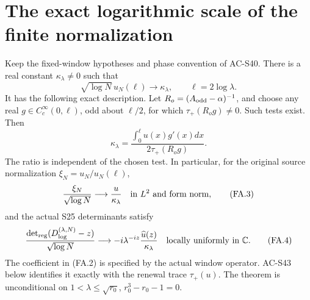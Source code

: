 \section{The exact logarithmic scale of the finite normalization}
\label{sec:spectral-endpoint-asymptotic}

\begin{theorem}
\label{AC-S41}
Keep the fixed-window hypotheses and phase convention of AC-S40.
There is a real constant \(\kappa_\lambda\ne0\) such that
\[
             \sqrt{\log N}\,u_N(\ell)
                    \longrightarrow\kappa_\lambda,
                 \qquad \ell=2\log\lambda.               \tag{FA.1}
\]
It has the following exact description.  Let
\(R_o=(A_{\rm odd}-\alpha)^{-1}\), and choose any real
\(g\in C_c^\infty(0,\ell)\), odd about \(\ell/2\), for which
\(\tau_+(R_og)\ne0\).  Such tests exist.  Then
\[
 \kappa_\lambda
       =\frac{\displaystyle\int_0^\ell u(x)g'(x)dx}
                    {2\tau_+(R_og)}.                    \tag{FA.2}
\]
The ratio is independent of the chosen test.
In particular, for the original source normalization
\(\xi_N=u_N/u_N(\ell)\),
\[
 \frac{\xi_N}{\sqrt{\log N}}
           \longrightarrow\frac{u}{\kappa_\lambda}
                  \quad\hbox{in }L^2\hbox{ and form norm},
                                                        \tag{FA.3}
\]
and the actual S25 determinants satisfy
\[
 \frac{\det_{\rm reg}(D^{(\lambda,N)}_{\log}-z)}
                           {\sqrt{\log N}}
      \longrightarrow
       -i\lambda^{-iz}\frac{\widehat u(z)}{\kappa_\lambda}
                 \quad\hbox{locally uniformly in }\mathbb C.
                                                        \tag{FA.4}
\]
The coefficient in (FA.2) is specified by the actual window
operator.  AC-S43 below identifies it exactly with the renewal trace
\(\tau_+(u)\).  The theorem is unconditional on
\(1<\lambda\leq\sqrt{r_0}\), \(r_0^3-r_0-1=0\).
\end{theorem}
